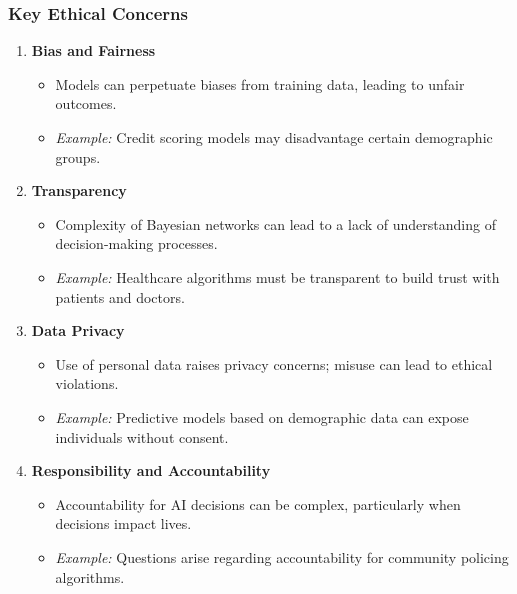 \documentclass[aspectratio=169]{beamer}
\begin{document}
\begin{frame}[fragile]
    \frametitle{Key Ethical Concerns}
    \begin{enumerate}
        \item \textbf{Bias and Fairness}
            \begin{itemize}
                \item Models can perpetuate biases from training data, leading to unfair outcomes.
                \item \textit{Example:} Credit scoring models may disadvantage certain demographic groups.
            \end{itemize}
        \item \textbf{Transparency}
            \begin{itemize}
                \item Complexity of Bayesian networks can lead to a lack of understanding of decision-making processes.
                \item \textit{Example:} Healthcare algorithms must be transparent to build trust with patients and doctors.
            \end{itemize}
        \item \textbf{Data Privacy}
            \begin{itemize}
                \item Use of personal data raises privacy concerns; misuse can lead to ethical violations.
                \item \textit{Example:} Predictive models based on demographic data can expose individuals without consent.
            \end{itemize}
        \item \textbf{Responsibility and Accountability}
            \begin{itemize}
                \item Accountability for AI decisions can be complex, particularly when decisions impact lives.
                \item \textit{Example:} Questions arise regarding accountability for community policing algorithms.
            \end{itemize}
    \end{enumerate}
\end{frame}
\end{document}
